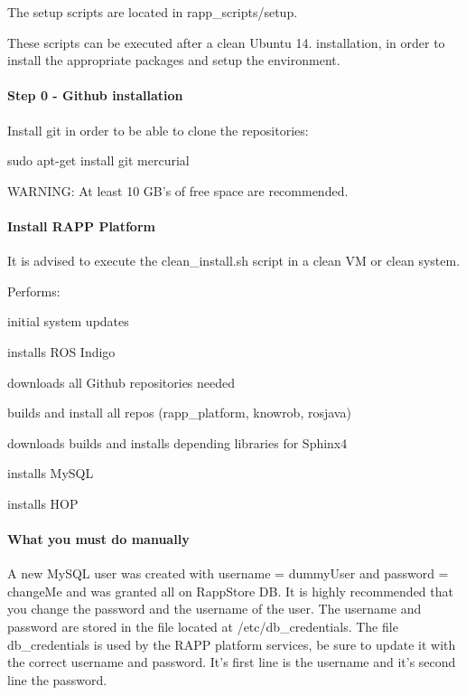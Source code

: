 The setup scripts are located in {\ttfamily rapp\-\_\-scripts/setup}.

These scripts can be executed after a clean Ubuntu 14. installation, in order to install the appropriate packages and setup the environment.

\paragraph*{Step 0 -\/ Github installation}

Install git in order to be able to clone the repositories\-:

{\ttfamily sudo apt-\/get install git mercurial}

W\-A\-R\-N\-I\-N\-G\-: At least 10 G\-B's of free space are recommended.

\paragraph*{Install R\-A\-P\-P Platform}

It is advised to execute the clean\-\_\-install.\-sh script in a clean V\-M or clean system.

Performs\-:
\begin{DoxyItemize}
\item initial system updates
\item installs R\-O\-S Indigo
\item downloads all Github repositories needed
\item builds and install all repos (rapp\-\_\-platform, knowrob, rosjava)
\item downloads builds and installs depending libraries for Sphinx4
\item installs My\-S\-Q\-L
\item installs H\-O\-P
\end{DoxyItemize}

\paragraph*{What you must do manually}

A new My\-S\-Q\-L user was created with username = {\ttfamily dummy\-User} and password = {\ttfamily change\-Me} and was granted all on Rapp\-Store D\-B. It is highly recommended that you change the password and the username of the user. The username and password are stored in the file located at /etc/db\-\_\-credentials. The file db\-\_\-credentials is used by the R\-A\-P\-P platform services, be sure to update it with the correct username and password. It's first line is the username and it's second line the password.

